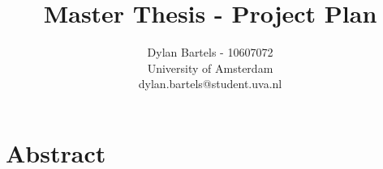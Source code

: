 \documentclass[11pt]{article}
\begin{document}
\title{Master Thesis - Project Plan}
\author{Dylan Bartels - 10607072\\University of Amsterdam \\dylan.bartels@student.uva.nl}
\maketitle

\section{Abstract}





\end{document}
